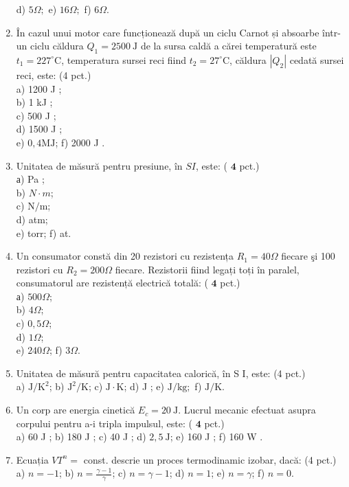 \begin{enumerate}
d) $5 \Omega ;$ e) $16 \Omega ;$ f) $6 \Omega$.
  \item În cazul unui motor care funcționează după un ciclu Carnot și absoarbe într-un ciclu căldura $Q_{1}=2500 \mathrm{~J}$ de la sursa caldă a cărei temperatură este $t_{1}=227^{\circ} \mathrm{C}$, temperatura sursei reci fiind $t_{2}=27^{\circ} \mathrm{C}$, căldura $\left|Q_{2}\right|$ cedată sursei reci, este: (4 pct.)\\
a) 1200 J ;\\
b) 1 kJ ;\\
c) 500 J ;\\
d) 1500 J ;\\
e) $0,4 \mathrm{MJ}$; f) 2000 J .
  \item Unitatea de măsură pentru presiune, în $S I$, este: ( $\mathbf{4}$ pct.)\\
а) Pa ;\\
b) $N \cdot m$;\\
c) $\mathrm{N} / \mathrm{m}$;\\
d) atm;\\
e) torr; f) at.
  \item Un consumator constă din 20 rezistori cu rezistența $R_{1}=40 \Omega$ fiecare şi 100 rezistori cu $R_{2}=200 \Omega$ fiecare. Rezistorii fiind legați toți în paralel, consumatorul are rezistență electrică totală: ( $\mathbf{4}$ pct.)\\
а) $500 \Omega$;\\
b) $4 \Omega$;\\
c) $0,5 \Omega$;\\
d) $1 \Omega$;\\
e) $240 \Omega$; f) $3 \Omega$.
  \item Unitatea de măsură pentru capacitatea calorică, în S I, este: (4 pct.)\\
a) $\mathrm{J} / \mathrm{K}^{2}$; b) $\mathrm{J}^{2} / \mathrm{K}$; c) $\mathrm{J} \cdot \mathrm{K}$; d) J ; e) $\mathrm{J} / \mathrm{kg} ;$ f) $\mathrm{J} / \mathrm{K}$.
  \item Un corp are energia cinetică $E_{c}=20 \mathrm{~J}$. Lucrul mecanic efectuat asupra corpului pentru a-i tripla impulsul, este: ( $\mathbf{4}$ pct.)\\
a) 60 J ; b) 180 J ; c) 40 J ; d) $2,5 \mathrm{~J}$; e) 160 J ; f) 160 W .
  \item Ecuația $V T^{n}=$ const. descrie un proces termodinamic izobar, dacă: (4 pct.)\\
a) $n=-1$; b) $n=\frac{\gamma-1}{\gamma}$; c) $n=\gamma-1$; d) $n=1$; e) $n=\gamma$; f) $n=0$.

\end{enumerate}
